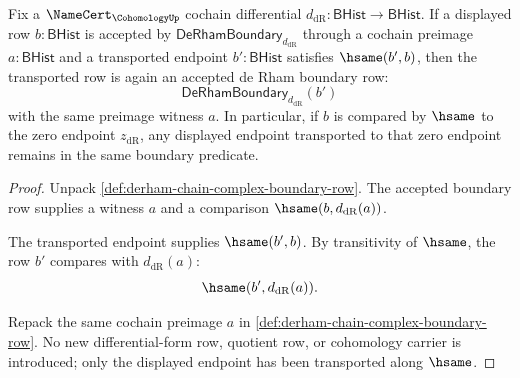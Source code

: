 \begin{theorem}
\label{thm:derham-boundary-zero-endpoint-transport}
Fix a $\NameCert_{\CohomologyUp}$ cochain differential
$d_{\mathrm{dR}}:\mathsf{BHist}\to\mathsf{BHist}$. If a displayed row
$b:\mathsf{BHist}$ is accepted by
$\mathsf{DeRhamBoundary}_{d_{\mathrm{dR}}}$ through a cochain preimage
$a:\mathsf{BHist}$ and a transported endpoint $b':\mathsf{BHist}$ satisfies
$\hsame(b',b)$, then the transported row is again an accepted de Rham
boundary row:
$$
\mathsf{DeRhamBoundary}_{d_{\mathrm{dR}}}(b')
$$
with the same preimage witness $a$. In particular, if $b$ is compared by
$\hsame$ to the zero endpoint $z_{\mathrm{dR}}$, any displayed endpoint
transported to that zero endpoint remains in the same boundary predicate.
\end{theorem}
\begin{proof}
Unpack \autoref{def:derham-chain-complex-boundary-row}. The accepted boundary
row supplies a witness $a$ and a comparison
$\hsame(b,d_{\mathrm{dR}}(a))$.

The transported endpoint supplies $\hsame(b',b)$. By transitivity of
$\hsame$, the row $b'$ compares with $d_{\mathrm{dR}}(a)$:
$$
\hsame(b',d_{\mathrm{dR}}(a)).
$$

Repack the same cochain preimage $a$ in
\autoref{def:derham-chain-complex-boundary-row}. No new differential-form row,
quotient row, or cohomology carrier is introduced; only the displayed endpoint
has been transported along $\hsame$.
\end{proof}

